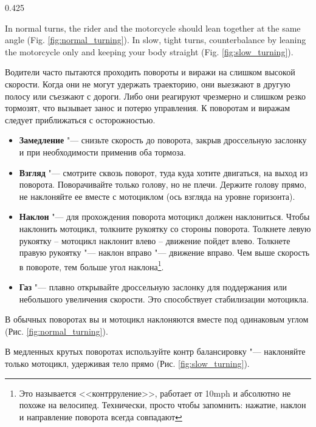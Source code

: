 \begin{langblock}{0.425}
\begin{eng}
	In normal turns, the rider and the motorcycle should lean together at the same angle (Fig. \ref{fig:normal_turning}). 
	In slow, tight turns, counterbalance by leaning the motorcycle only and keeping your body straight (Fig. \ref{fig:slow_turning}).
	\end{eng}
	\begin{rus}
		Водители часто пытаются проходить повороты и виражи на слишком высокой скорости. Когда они не могут удержать траекторию, они выезжают в другую полосу или съезжают с дороги. Либо они реагируют чрезмерно и слишком резко тормозят, что вызывает занос и потерю управления. К поворотам и виражам следует приближаться с осторожностью.
		\begin{itemize}
			\item \textbf{Замедление} "--- снизьте скорость до поворота, закрыв дроссельную заслонку и при необходимости применив оба тормоза.
			\item \textbf{Взгляд} "--- смотрите сквозь поворот, туда куда хотите двигаться, на выход из поворота. Поворачивайте только голову, но не плечи. Держите голову прямо, не наклоняйте ее вместе с мотоциклом (ось взгляда на уровне горизонта).
			\item \textbf{Наклон} "--- для прохождения поворота мотоцикл должен наклониться. Чтобы наклонить мотоцикл, толкните рукоятку со стороны поворота. Толкнете левую рукоятку -- мотоцикл наклонит влево -- движение пойдет влево. Толкнете правую рукоятку "--- наклон вправо "--- движение вправо. Чем выше скорость в повороте, тем больше угол наклона\footnote{Это называется <<контрруление>>, работает от 10mph и абсолютно не похоже на велосипед. Технически, просто чтобы запомнить: нажатие, наклон и направление поворота всегда совпадают}.
			\item \textbf{Газ} "--- плавно открывайте дроссельную заслонку для поддержания или небольшого увеличения скорости. Это способствует стабилизации мотоцикла.
		\end{itemize}
		В обычных поворотах вы и мотоцикл наклоняются вместе под одинаковым углом (Рис. \ref{fig:normal_turning}). 
		
		В медленных крутых поворотах используйте контр балансировку "--- наклоняйте только мотоцикл, удерживая тело прямо  (Рис. \ref{fig:slow_turning}).
\end{rus}
\end{langblock}



